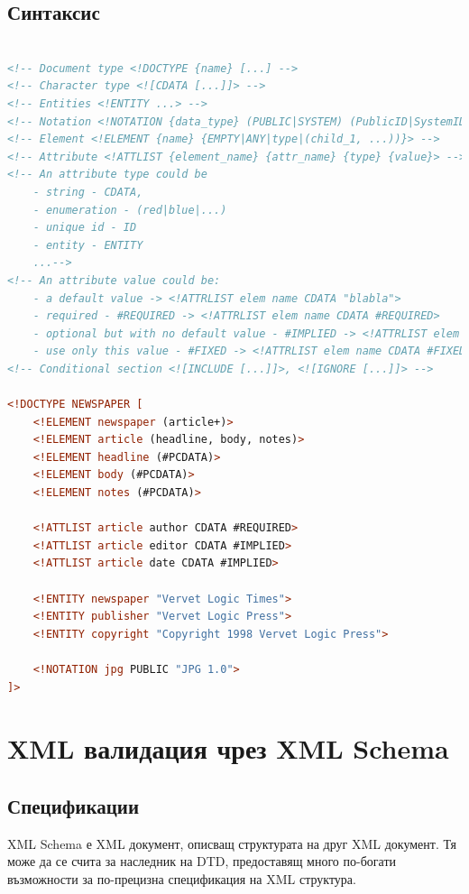\documentclass[fleqn,12pt]{article}
\begin{document}
\subsection{Синтаксис}

\begin{lstlisting}[language=XML, caption=Newspaper DTD]

<!-- Document type <!DOCTYPE {name} [...] -->
<!-- Character type <![CDATA [...]]> -->
<!-- Entities <!ENTITY ...> -->
<!-- Notation <!NOTATION {data_type} (PUBLIC|SYSTEM) (PublicID|SystemID)> -->
<!-- Element <!ELEMENT {name} {EMPTY|ANY|type|(child_1, ...))}> -->
<!-- Attribute <!ATTLIST {element_name} {attr_name} {type} {value}> -->
<!-- An attribute type could be 
    - string - CDATA,
    - enumeration - (red|blue|...) 
    - unique id - ID 
    - entity - ENTITY
    ...-->
<!-- An attribute value could be:
    - a default value -> <!ATTRLIST elem name CDATA "blabla">
    - required - #REQUIRED -> <!ATTRLIST elem name CDATA #REQUIRED>
    - optional but with no default value - #IMPLIED -> <!ATTRLIST elem name CDATA #IMPLIED>
    - use only this value - #FIXED -> <!ATTRLIST elem name CDATA #FIXED "constant-value"> -->
<!-- Conditional section <![INCLUDE [...]]>, <![IGNORE [...]]> -->

<!DOCTYPE NEWSPAPER [
    <!ELEMENT newspaper (article+)>
    <!ELEMENT article (headline, body, notes)>
    <!ELEMENT headline (#PCDATA)>
    <!ELEMENT body (#PCDATA)>
    <!ELEMENT notes (#PCDATA)>

    <!ATTLIST article author CDATA #REQUIRED>
    <!ATTLIST article editor CDATA #IMPLIED>
    <!ATTLIST article date CDATA #IMPLIED>

    <!ENTITY newspaper "Vervet Logic Times">
    <!ENTITY publisher "Vervet Logic Press">
    <!ENTITY copyright "Copyright 1998 Vervet Logic Press">

    <!NOTATION jpg PUBLIC "JPG 1.0">
]>
\end{lstlisting}

\section{XML валидация чрез XML Schema}

\subsection{Спецификации}

XML Schema е XML документ, описващ структурата на друг XML документ.
Тя може да се счита за наследник на DTD, предоставящ много по-богати възможности за по-прецизна спецификация на XML структура.
\end{document}

